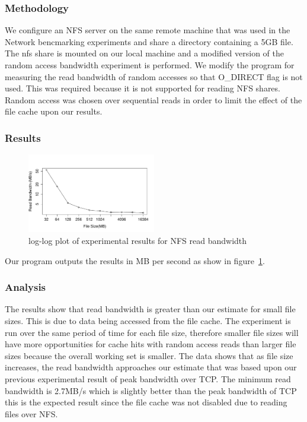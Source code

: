 \subsubsection{Methodology}

We configure an NFS server on the same remote machine that was used in the Network bencmarking experiments and share a directory containing a 5GB file. The nfs share is mounted on our local machine and a 
modified version of the random access bandwidth experiment is performed. We modify the program for measuring the read bandwidth of random accesses so that O\_DIRECT flag is not used. This was required because 
it is not supported for reading NFS shares. Random access was chosen over sequential reads in order to limit the effect of the file cache upon our results.

\subsubsection{Results}

\begin{figure}
    \centering
    \includegraphics[width=0.5\textwidth]{nfsresults.pdf}
    \caption{log-log plot of experimental results for NFS read bandwidth}
    \label{fig:nfsresult}
\end{figure}

Our program outputs the results in MB per second as show in figure~\ref{fig:nfsresult}.

\subsubsection{Analysis}

The results show that read bandwidth is greater than our estimate for small
file sizes. This is due to data being accessed from the file cache.  The
experiment is run over the same period of time for each file size, therefore
smaller file sizes will have more opportunities for cache hits with random
access reads than larger file sizes because the overall working set is smaller.
The data shows that as file size increases, the read bandwidth approaches our
estimate that was based upon our previous experimental result of peak bandwidth
over TCP. The minimum read bandwidth is 2.7MB/s which is slightly better than
the peak bandwidth of TCP this is the expected result since the file cache was
not disabled due to reading files over NFS.


